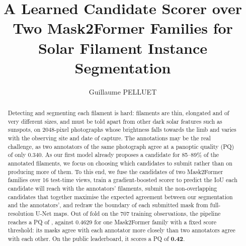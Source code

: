 \documentclass[sigconf]{acmart}
\begin{document}
\title[A Learned Candidate Scorer for Solar Filament Segmentation]{A Learned Candidate Scorer over Two Mask2Former Families for Solar Filament Instance Segmentation}  %
\subtitle{} %


\author{Guillaume PELLUET}

\begin{abstract}
     Detecting and segmenting each filament is hard: filaments are thin, elongated and of very different sizes, and must be told apart from other dark solar features such as sunspots, on 2048-pixel photographs whose brightness falls towards the limb and varies with the observing site and date of capture. The annotations may be the real challenge, as two annotators of the same photograph agree at a panoptic quality (PQ) of only 0.340. As our first model already proposes a candidate for 85--89\% of the annotated filaments, we focus on choosing which candidates to submit rather than on producing more of them. To this end, we fuse the candidates of two Mask2Former families over 16 test-time views, train a gradient-boosted scorer to predict the IoU each candidate will reach with the annotators' filaments, submit the non-overlapping candidates that together maximise the expected agreement between our segmentation and the annotators', and redraw the boundary of each submitted mask from full-resolution U-Net maps. Out of fold on the 707 training observations, the pipeline reaches a PQ of , against 0.4629 for one Mask2Former family with a fixed score threshold: its masks agree with each annotator more closely than two annotators agree with each other. On the public leaderboard, it scores a PQ of \textbf{0.42}.
\end{abstract}

\maketitle

\ifguideStyle
{}
\par\medskip
\fi
\end{document}
